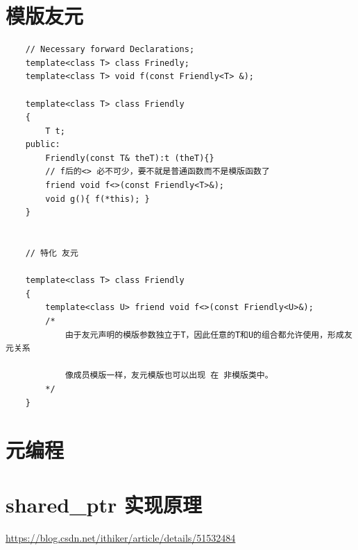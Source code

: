 \documentclass[UTF8,a4paper,12pt]{ctexbook}
\begin{document}
\section{模版友元}
	\begin{lstlisting}
	// Necessary forward Declarations;
	template<class T> class Frinedly;
	template<class T> void f(const Friendly<T> &);
	
	template<class T> class Friendly
	{
		T t;
	public:
		Friendly(const T& theT):t (theT){}
		// f后的<> 必不可少，要不就是普通函数而不是模版函数了
		friend void f<>(const Friendly<T>&);
		void g(){ f(*this); }
	}
	
	
	// 特化 友元
	
	template<class T> class Friendly
	{
		template<class U> friend void f<>(const Friendly<U>&);
		/*
			由于友元声明的模版参数独立于T，因此任意的T和U的组合都允许使用，形成友元关系
			
			像成员模版一样，友元模版也可以出现 在 非模版类中。
		*/
	}
	\end{lstlisting}	
	
\section{元编程}

\section{shared\_ptr 实现原理}	
	\url{https://blog.csdn.net/ithiker/article/details/51532484}
\end{document}

